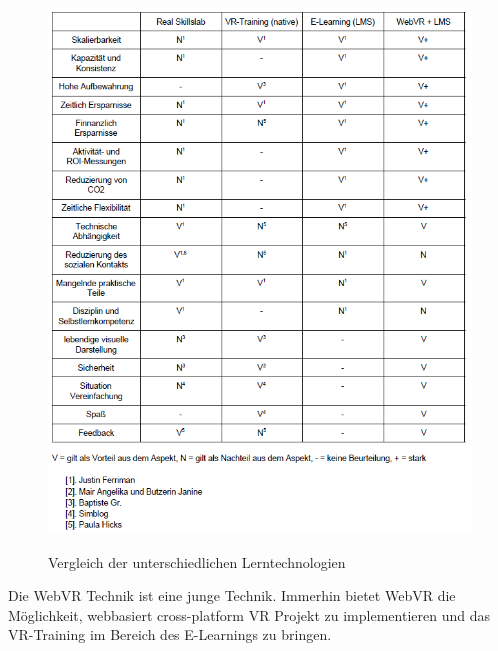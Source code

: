 \begin{figure}[ht]
\vspace*{1em}
\centering
\caption{Vergleich der unterschiedlichen Lerntechnologien}
\includegraphics[width=\textwidth]{images/standDerForschungTabelle.png}
\label{fig:standDerForschungTabelle} 
\end{figure}

Die WebVR Technik ist eine junge Technik. Immerhin bietet WebVR die Möglichkeit, webbasiert cross-platform VR Projekt zu implementieren und das VR-Training im Bereich des E-Learnings zu bringen.



